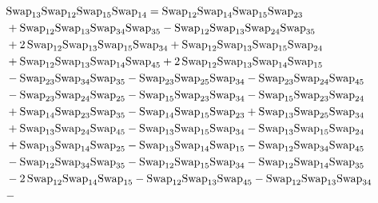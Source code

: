 \documentclass[12pt,dvipsnames,accepted=2016-08-18,a4paper,onecolumn]{quantumarticle}
\numberwithin{equation}{section}
\theoremstyle{definition}
\begin{document}
\begin{align*}
        \\
        &\textnormal{Swap}_{13}   \textnormal{Swap}_{12}   \textnormal{Swap}_{15}   \textnormal{Swap}_{14} = \textnormal{Swap}_{12} \textnormal{Swap}_{14} \textnormal{Swap}_{15} \textnormal{Swap}_{23} \\ & + \textnormal{Swap}_{12} \textnormal{Swap}_{13} \textnormal{Swap}_{34} \textnormal{Swap}_{35} - \textnormal{Swap}_{12} \textnormal{Swap}_{13} \textnormal{Swap}_{24} \textnormal{Swap}_{35}\\ & + 2\,\textnormal{Swap}_{12} \textnormal{Swap}_{13} \textnormal{Swap}_{15} \textnormal{Swap}_{34} +
        \textnormal{Swap}_{12} \textnormal{Swap}_{13} \textnormal{Swap}_{15} \textnormal{Swap}_{24}\\ & + \textnormal{Swap}_{12} \textnormal{Swap}_{13} \textnormal{Swap}_{14} \textnormal{Swap}_{45} + 2\,\textnormal{Swap}_{12} \textnormal{Swap}_{13} \textnormal{Swap}_{14} \textnormal{Swap}_{15}\\ & - \textnormal{Swap}_{23} \textnormal{Swap}_{34} \textnormal{Swap}_{35} -
        \textnormal{Swap}_{23} \textnormal{Swap}_{25} \textnormal{Swap}_{34} - \textnormal{Swap}_{23} \textnormal{Swap}_{24} \textnormal{Swap}_{45}\\ & - \textnormal{Swap}_{23} \textnormal{Swap}_{24} \textnormal{Swap}_{25} - \textnormal{Swap}_{15} \textnormal{Swap}_{23} \textnormal{Swap}_{34} - \textnormal{Swap}_{15} \textnormal{Swap}_{23} \textnormal{Swap}_{24}\\ & +
        \textnormal{Swap}_{14} \textnormal{Swap}_{23} \textnormal{Swap}_{35} - \textnormal{Swap}_{14} \textnormal{Swap}_{15} \textnormal{Swap}_{23} + \textnormal{Swap}_{13} \textnormal{Swap}_{25} \textnormal{Swap}_{34}\\ & + \textnormal{Swap}_{13} \textnormal{Swap}_{24} \textnormal{Swap}_{45} - \textnormal{Swap}_{13} \textnormal{Swap}_{15} \textnormal{Swap}_{34} -
        \textnormal{Swap}_{13} \textnormal{Swap}_{15} \textnormal{Swap}_{24}\\ & + \textnormal{Swap}_{13} \textnormal{Swap}_{14} \textnormal{Swap}_{25} - \textnormal{Swap}_{13} \textnormal{Swap}_{14} \textnormal{Swap}_{15} - \textnormal{Swap}_{12} \textnormal{Swap}_{34} \textnormal{Swap}_{45}\\ & - \textnormal{Swap}_{12} \textnormal{Swap}_{34} \textnormal{Swap}_{35} -
        \textnormal{Swap}_{12} \textnormal{Swap}_{15} \textnormal{Swap}_{34} - \textnormal{Swap}_{12} \textnormal{Swap}_{14} \textnormal{Swap}_{35}\\ & - 2\,\textnormal{Swap}_{12} \textnormal{Swap}_{14} \textnormal{Swap}_{15} - \textnormal{Swap}_{12} \textnormal{Swap}_{13} \textnormal{Swap}_{45} - \textnormal{Swap}_{12} \textnormal{Swap}_{13} \textnormal{Swap}_{34}\\ & -

\end{align*}
\end{document}
